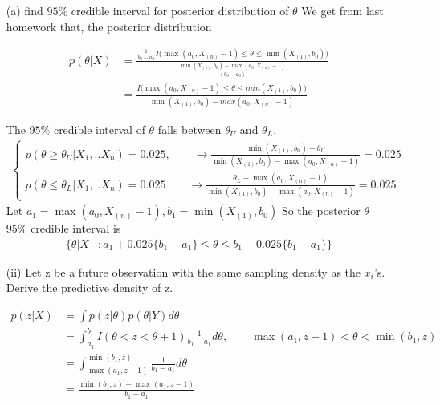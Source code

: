 \begin{itemize}
	\item [(a)] find $95\%$ credible interval for posterior distribution of $\theta$
	We get from last homework that, the posterior distribution 

\begin{align*}
	p(\theta|X) &= \frac{\frac{1}{ b_0 - a_0}  I \Big( \max(a_0, X_{(n)}-1) \leq \theta \leq \min(X_{(1)}, b_0) \Big)}{\frac{\min(X_{(1)}, b_0) - \max(a_0, X_{(n)}-1) }{ (b_0 - a_0)}} \\
	&= \frac{ I \Big( \max(a_0, X_{(n)}-1) \leq \theta \leq min(X_{(1)}, b_0) \Big)}{\min(X_{(1)}, b_0) -max(a_0, X_{(n)}-1)}
\end{align*}	

	The $95\%$ credible interval of $\theta$ falls between $\theta_U$ and $\theta_L$, 
\begin{align*}
	\begin{cases*}
		p(\theta \geq \theta_{U} |X_1, ..X_n) =  0.025, \qquad \rightarrow \frac{\min(X_{(1)}, b_0)-  \theta_{U} }{\min(X_{(1)}, b_0) - \max(a_0, X_{(n)}-1)} = 0.025 \\
		p(\theta \leq \theta_{L} |X_1, ..X_n)  = 0.025 \qquad  \rightarrow  \frac{\theta_{L} - \max(a_0, X_{(n)}-1)}{\min(X_{(1)}, b_0) - \max(a_0, X_{(n)}-1)} = 0.025
	\end{cases*}
\end{align*}	
Let $a_1 = \max(a_0, X_{(n)}-1) , b_1 = \min(X_{(1)}, b_0)$	So the posterior $\theta$ $95\%$ credible interval is 
\begin{align*}
	\Bigg \{ \theta|X &: a_1 + 0.025 \{b_1 - a_1\} \leq \theta  \leq  b_1- 0.025 \{b_1 - a_1\} \Bigg \}
\end{align*}	
	
\item[(ii)] Let z be a future observation with the same sampling density as the $x_i$'s. Derive the predictive density of z.

\begin{align*}
   p(z | X) &= \int p(z | \theta) p(\theta| Y) d\theta \\
   & = \int_{a_1}^{b_1} I( \theta < z < \theta+1)  \frac{1}{b_1 - a_1} d\theta , \qquad  \max(a_1, z-1) <  \theta < \min(b_1, z) \\
   &= \int_{\max(a_1, z-1) }^{\min(b_1, z)} \frac{1}{b_1 - a_1} d\theta \\
   &=  \frac{\min(b_1, z) - \max(a_1, z-1)}{b_1 - a_1} 
\end{align*}


\end{itemize}
